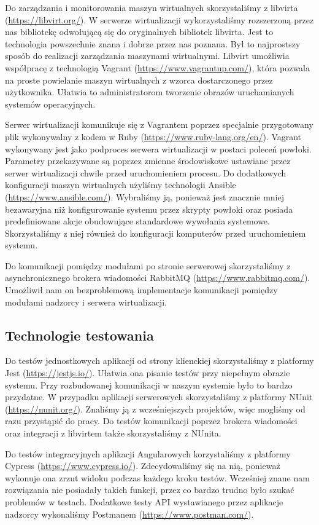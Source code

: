 \documentclass[../opis-rozwiazania.tex]{subfiles}
\begin{document}
Do zarządzania i monitorowania maszyn wirtualnych skorzystaliśmy z libvirta (\url{https://libvirt.org/}).
W serwerze wirtualizacji wykorzystaliśmy rozszerzoną przez nas bibliotekę odwołującą się do oryginalnych bibliotek libvirta.
Jest to technologia powszechnie znana i dobrze przez nas poznana. Był to najprostszy sposób do realizacji zarządzania maszynami wirtualnymi.
Libvirt umożliwia współpracę z technologią Vagrant (\url{https://www.vagrantup.com/}), która pozwala na proste powielanie maszyn wirtualnych z wzorca dostarczonego przez użytkownika.
Ułatwia to administratorom tworzenie obrazów uruchamianych systemów operacyjnych.

Serwer wirtualizacji komunikuje się z Vagrantem poprzez specjalnie przygotowany plik wykonywalny z kodem w Ruby (\url{https://www.ruby-lang.org/en/}).
Vagrant wykonywany jest jako podproces serwera wirtualizacji w postaci poleceń powłoki.
Parametry przekazywane są poprzez zmienne środowiskowe ustawiane przez serwer wirtualizacji chwile przed uruchomieniem procesu.
Do dodatkowych konfiguracji maszyn wirtualnych użyliśmy technologii Ansible (\url{https://www.ansible.com/}).
Wybraliśmy ją, ponieważ jest znacznie mniej bezawaryjna niż konfigurowanie systemu przez skrypty powłoki oraz posiada predefiniowane akcje obudowujące standardowe wywołania systemowe.
Skorzystaliśmy z niej również do konfiguracji komputerów przed uruchomieniem systemu.

Do komunikacji pomiędzy modułami po stronie serwerowej skorzystaliśmy z asynchronicznego brokera wiadomości RabbitMQ (\url{https://www.rabbitmq.com/}).
Umożliwił nam on bezproblemową implementacje komunikacji pomiędzy modułami nadzorcy i serwera wirtualizacji.

\subsection{Technologie testowania}
Do testów jednostkowych aplikacji od strony klienckiej skorzystaliśmy z platformy Jest (\url{https://jestjs.io/}).
Ułatwia ona pisanie testów przy niepełnym obrazie systemu. Przy rozbudowanej komunikacji w naszym systemie było to bardzo przydatne.
W przypadku aplikacji serwerowych skorzystaliśmy z platformy NUnit (\url{https://nunit.org/}).
Znaliśmy ją z wcześniejszych projektów, więc mogliśmy od razu przystąpić do pracy.
Do testów komunikacji poprzez brokera wiadomości oraz integracji z libvirtem także skorzystaliśmy z NUnita.

Do testów integracyjnych aplikacji Angularowych korzystaliśmy z platformy Cypress (\url{https://www.cypress.io/}).
Zdecydowaliśmy się na nią, ponieważ wykonuje ona zrzut widoku podczas każdego kroku testów.
Wcześniej znane nam rozwiązania nie posiadały takich funkcji, przez co bardzo trudno było szukać problemów w testach.
Dodatkowe testy API wystawianego przez aplikacje nadzorcy wykonaliśmy Postmanem (\url{https://www.postman.com/}).
\end{document}
